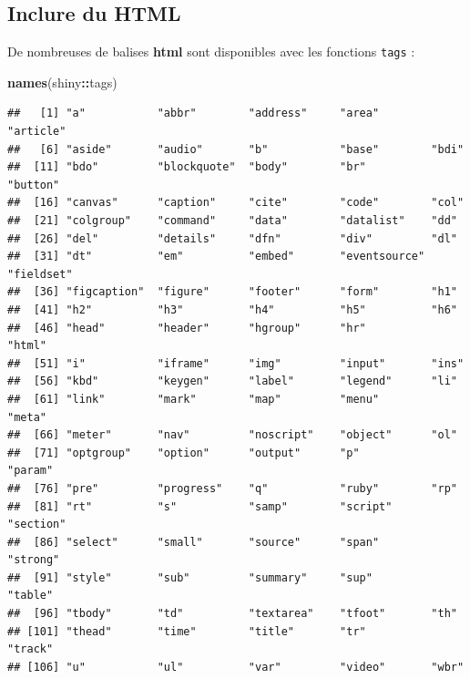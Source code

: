 \documentclass[]{article}
\newenvironment{Shaded}{\begin{snugshade}}{\end{snugshade}}
\newcommand{\KeywordTok}[1]{\textcolor[rgb]{0.13,0.29,0.53}{\textbf{#1}}}
\newcommand{\OperatorTok}[1]{\textcolor[rgb]{0.81,0.36,0.00}{\textbf{#1}}}
\newcommand{\NormalTok}[1]{#1}
\begin{document}
\subsection{Inclure du HTML}\label{inclure-du-html}

De nombreuses de balises \textbf{html} sont disponibles avec les
fonctions \texttt{tags} :

\begin{Shaded}
\begin{Highlighting}[]
\KeywordTok{names}\NormalTok{(shiny}\OperatorTok{::}\NormalTok{tags)}
\end{Highlighting}
\end{Shaded}

\begin{verbatim}
##   [1] "a"           "abbr"        "address"     "area"        "article"    
##   [6] "aside"       "audio"       "b"           "base"        "bdi"        
##  [11] "bdo"         "blockquote"  "body"        "br"          "button"     
##  [16] "canvas"      "caption"     "cite"        "code"        "col"        
##  [21] "colgroup"    "command"     "data"        "datalist"    "dd"         
##  [26] "del"         "details"     "dfn"         "div"         "dl"         
##  [31] "dt"          "em"          "embed"       "eventsource" "fieldset"   
##  [36] "figcaption"  "figure"      "footer"      "form"        "h1"         
##  [41] "h2"          "h3"          "h4"          "h5"          "h6"         
##  [46] "head"        "header"      "hgroup"      "hr"          "html"       
##  [51] "i"           "iframe"      "img"         "input"       "ins"        
##  [56] "kbd"         "keygen"      "label"       "legend"      "li"         
##  [61] "link"        "mark"        "map"         "menu"        "meta"       
##  [66] "meter"       "nav"         "noscript"    "object"      "ol"         
##  [71] "optgroup"    "option"      "output"      "p"           "param"      
##  [76] "pre"         "progress"    "q"           "ruby"        "rp"         
##  [81] "rt"          "s"           "samp"        "script"      "section"    
##  [86] "select"      "small"       "source"      "span"        "strong"     
##  [91] "style"       "sub"         "summary"     "sup"         "table"      
##  [96] "tbody"       "td"          "textarea"    "tfoot"       "th"         
## [101] "thead"       "time"        "title"       "tr"          "track"      
## [106] "u"           "ul"          "var"         "video"       "wbr"
\end{verbatim}
\end{document}
